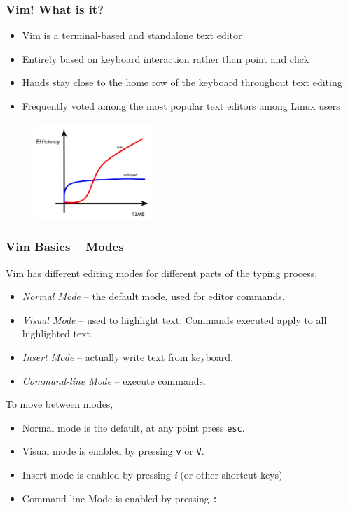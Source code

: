 \documentclass{beamer}
\begin{document}
\begin{frame}
  \frametitle{Vim! What is it?}
  \begin{itemize}
    \item Vim is a terminal-based and standalone text editor
    \item Entirely based on keyboard interaction rather than point and click
    \item Hands stay close to the home row of the keyboard throughout text editing
    \item Frequently voted among the most popular text editors among Linux users
  \end{itemize}
  \begin{figure}
    \centering
    \includegraphics[width=0.4\textwidth]{vimspeed.jpg}
  \end{figure}
\end{frame}

\begin{frame}
  \frametitle{Vim Basics -- Modes}
  Vim has different editing modes for different parts of the typing process,
  \begin{itemize}
    \item \emph{Normal Mode} -- the default mode, used for editor commands.
    \item \emph{Visual Mode} -- used to highlight text. Commands executed apply to all highlighted text.
    \item \emph{Insert Mode} -- actually write text from keyboard.
    \item \emph{Command-line Mode} -- execute commands.
  \end{itemize}
  To move between modes,
  \begin{itemize}
    \item Normal mode is the default, at any point press \texttt{esc}.
    \item Visual mode is enabled by pressing \texttt{v} or \texttt{V}.
    \item Insert mode is enabled by pressing \emph{i} (or other shortcut keys)
    \item Command-line Mode is enabled by pressing \texttt{:}
  \end{itemize}
\end{frame}
\end{document}
